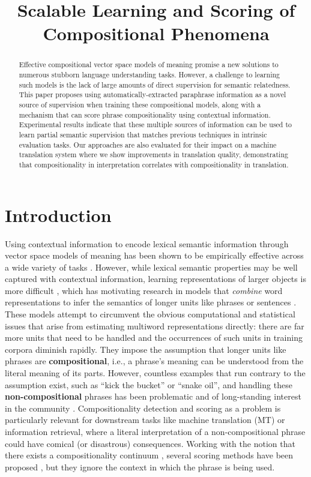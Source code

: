 \documentclass[11pt,letterpaper]{article}
\title{Scalable Learning and Scoring of Compositional Phenomena}
\date{}
\begin{document}
\maketitle
\begin{abstract}
Effective compositional vector space models of meaning promise a new solutions to numerous stubborn language understanding tasks. However, a challenge to learning such models is the lack of large amounts of direct supervision for semantic relatedness. 
This paper proposes using automatically-extracted paraphrase information as a novel source of supervision when training these compositional models, along with a mechanism that can score phrase compositionality using contextual information. 
	Experimental results indicate that these multiple sources of information can be used to learn partial semantic supervision that matches previous techniques in intrinsic evaluation tasks. 
	Our approaches are also evaluated for their impact on a machine translation system where we show improvements in translation quality, demonstrating that compositionality in interpretation correlates with compositionality in translation. 
 \end{abstract}

\section{Introduction}

Using contextual information to encode lexical semantic information through vector space models of meaning has been shown to be empirically effective across a wide variety of tasks \cite{Turian2010,Turney2010,Mikolov2013b}.
However, while lexical semantic properties may be well captured with contextual information, learning representations of larger objects is more difficult \cite[\emph{inter alia}]{Sahlgren2006,Collobert2011}, which has motivating research in models that \emph{combine} word representations to infer the semantics of longer units like phrases or sentences \cite{Mitchell2010,Baroni2010,Socher2013}.
These models attempt to circumvent the obvious computational and statistical issues that arise from estimating multiword representations directly: there are far more units that need to be handled and the occurrences of such units in training corpora diminish rapidly.  
They impose the assumption that longer units like phrases are \textbf{compositional}, i.e., a phrase's meaning can be understood from the literal meaning of its parts. 
However, countless examples that run contrary to the assumption exist, such as ``kick the bucket'' or ``snake oil'', and handling these \textbf{non-compositional} phrases has been problematic and of long-standing interest in the community \cite{Lin1999,Sag2002}.
Compositionality detection and scoring as a problem is particularly relevant for downstream tasks like machine translation (MT) or information retrieval, where a literal interpretation of a non-compositional phrase could have comical (or disastrous) consequences. 
Working with the notion that there exists a compositionality continuum \cite{McCarthy2003}, several scoring methods have been proposed \cite{Reddy2011,Kiela2013,Salehi2014}, but they ignore the context in which the phrase is being used.
\end{document}
